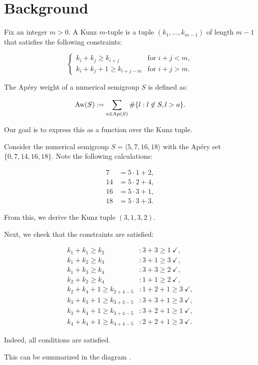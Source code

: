 \documentclass[11pt]{article}
\title{}
\author{Erik Imathiu-Jones}
\begin{document}
\section{Background}

Fix an integer \(m > 0\). A Kunz \(m\)-tuple is a tuple \((k_1, \dots, k_{m-1})\) of length \(m-1\) that satisfies the following constraints:

\[
\begin{cases}
k_i + k_j \ge k_{i + j} & \text{for } i + j < m, \\
k_i + k_j + 1 \ge k_{i + j - m} & \text{for } i + j > m.
\end{cases}
\]

The Ap\'ery weight of a numerical semigroup \(S\) is defined as:

\[
\text{Aw}(S) := \sum\limits_{a \in \text{Ap}(S)} \#\{l : l \not\in S, l > a\}.
\]

Our goal is to express this as a function over the Kunz tuple.

\begin{example}
    Consider the numerical semigroup \(S = \langle 5, 7, 16, 18 \rangle\) with the Ap\'ery set \(\{0, 7, 14, 16, 18\}\). Note the following calculations:
    
    \begin{align*}
        7 &= 5 \cdot 1 + 2, \\
        14 &= 5 \cdot 2 + 4, \\
        16 &= 5 \cdot 3 + 1, \\
        18 &= 5 \cdot 3 + 3.
    \end{align*}
    
    From this, we derive the Kunz tuple \((3, 1, 3, 2)\).

    Next, we check that the constraints are satisfied:

    \begin{align*}
        k_1 + k_1 \ge k_2 &: 3 + 3 \ge 1 ~ \checkmark, \\
        k_1 + k_2 \ge k_3 &: 3 + 1 \ge 3 ~ \checkmark, \\
        k_1 + k_3 \ge k_4 &: 3 + 3 \ge 2 ~ \checkmark, \\
        k_2 + k_2 \ge k_4 &: 1 + 1 \ge 2 ~ \checkmark, \\
        k_2 + k_4 + 1 \ge k_{2 + 4 - 5} &: 1 + 2 + 1 \ge 3 ~ \checkmark, \\
        k_3 + k_3 + 1 \ge k_{3 + 3 - 5} &: 3 + 3 + 1 \ge 3 ~ \checkmark, \\
        k_3 + k_4 + 1 \ge k_{3 + 4 - 5} &: 3 + 2 + 1 \ge 1 ~ \checkmark, \\
        k_4 + k_4 + 1 \ge k_{4 + 4 - 5} &: 2 + 2 + 1 \ge 3 ~ \checkmark.
    \end{align*}

    Indeed, all conditions are satisfied.

    This can be summarized in the diagram .
\end{example}
\end{document}
